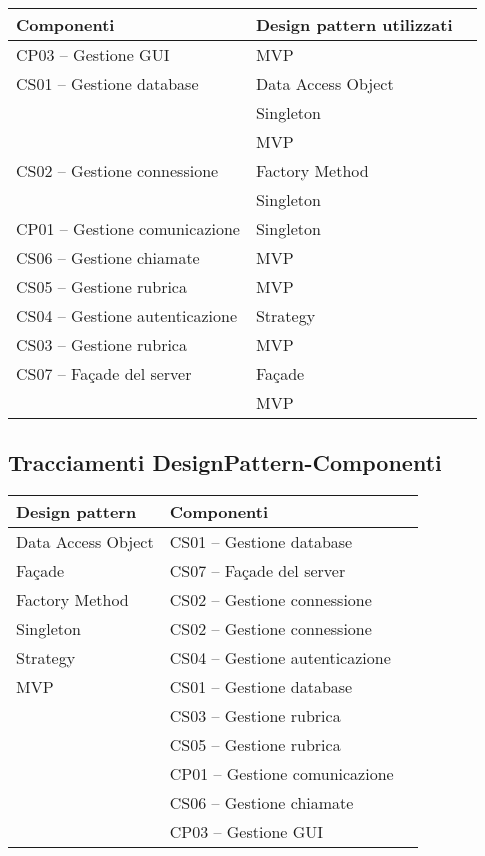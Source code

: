 \begin{center}
\begin{longtable}{lp{}l}
\toprule Componenti & Design pattern utilizzati\\
\midrule
CP03 -- Gestione GUI & MVP \\
CS01 -- Gestione database & Data Access Object \\
& Singleton \\
& MVP \\
CS02 -- Gestione connessione & Factory Method \\
 & Singleton \\
CP01 -- Gestione comunicazione & Singleton \\
CS06 -- Gestione chiamate & MVP \\
CS05 -- Gestione rubrica & MVP \\
CS04 -- Gestione autenticazione & Strategy \\
CS03 -- Gestione rubrica & MVP \\
CS07 -- Façade del server & Façade \\
& MVP \\
\bottomrule
\end{longtable}
\end{center}
\subsection{Tracciamenti DesignPattern-Componenti}\label{sec:tracDpComp}

\begin{center}
\begin{longtable}{lp{}l}
\toprule Design pattern & Componenti\\
\midrule
Data Access Object & CS01 -- Gestione database\\
Façade & CS07 -- Façade del server\\
Factory Method & CS02 -- Gestione connessione\\
Singleton & CS02 -- Gestione connessione\\
Strategy & CS04 -- Gestione autenticazione\\
MVP & CS01 -- Gestione database\\
& CS03 -- Gestione rubrica\\
& CS05 -- Gestione rubrica\\
& CP01 -- Gestione comunicazione\\
& CS06 -- Gestione chiamate\\
& CP03 -- Gestione GUI\\
\bottomrule
\end{longtable}
\end{center}
